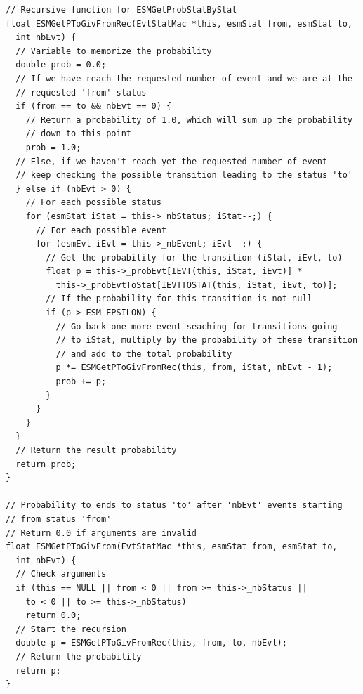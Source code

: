 \documentclass[12pt, a4paper]{article}
\begin{document}
\begin{scriptsize}
\begin{ttfamily}
\begin{lstlisting}
// Recursive function for ESMGetProbStatByStat
float ESMGetPToGivFromRec(EvtStatMac *this, esmStat from, esmStat to, 
  int nbEvt) {
  // Variable to memorize the probability
  double prob = 0.0;
  // If we have reach the requested number of event and we are at the
  // requested 'from' status
  if (from == to && nbEvt == 0) {
    // Return a probability of 1.0, which will sum up the probability 
    // down to this point
    prob = 1.0;
  // Else, if we haven't reach yet the requested number of event
  // keep checking the possible transition leading to the status 'to'
  } else if (nbEvt > 0) {
    // For each possible status
    for (esmStat iStat = this->_nbStatus; iStat--;) {
      // For each possible event
      for (esmEvt iEvt = this->_nbEvent; iEvt--;) {
        // Get the probability for the transition (iStat, iEvt, to)
        float p = this->_probEvt[IEVT(this, iStat, iEvt)] * 
          this->_probEvtToStat[IEVTTOSTAT(this, iStat, iEvt, to)];
        // If the probability for this transition is not null
        if (p > ESM_EPSILON) {
          // Go back one more event seaching for transitions going 
          // to iStat, multiply by the probability of these transition
          // and add to the total probability
          p *= ESMGetPToGivFromRec(this, from, iStat, nbEvt - 1);
          prob += p;
        }
      }
    }
  }
  // Return the result probability
  return prob;
}

// Probability to ends to status 'to' after 'nbEvt' events starting 
// from status 'from'
// Return 0.0 if arguments are invalid
float ESMGetPToGivFrom(EvtStatMac *this, esmStat from, esmStat to, 
  int nbEvt) {
  // Check arguments
  if (this == NULL || from < 0 || from >= this->_nbStatus ||
    to < 0 || to >= this->_nbStatus) 
    return 0.0;
  // Start the recursion
  double p = ESMGetPToGivFromRec(this, from, to, nbEvt);
  // Return the probability
  return p;
}


\end{lstlisting}
\end{ttfamily}
\end{scriptsize}
\end{document}

